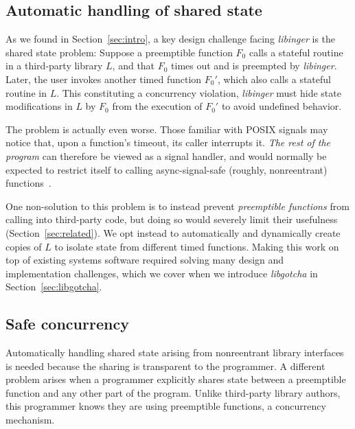 

\subsection{Automatic handling of shared state}
\label{sec:libinger:reentrancy}

As we found in Section~\ref{sec:intro}, a key design challenge facing
\textit{libinger} is the shared state problem:  Suppose a preemptible function
$F_0$ calls a stateful routine in a third-party library $L$, and
that $F_0$ times out and is preempted by \textit{libinger}.  Later, the
user invokes another timed function $F_0'$, which also calls a stateful
routine in $L$.  This constituting a concurrency violation,
\textit{libinger} must hide state modifications in $L$ by $F_0$
from the execution of $F_0'$ to avoid undefined behavior.

The problem is actually even worse.  Those familiar with POSIX signals may notice
that, upon a function's timeout, its caller interrupts it.  \textit{The rest of the
program} can therefore be viewed as a signal handler, and would normally be expected
to restrict itself to calling async-signal-safe (roughly, nonreentrant)
functions~\cite{signal-safety-manpage}.

One non-solution to this problem is to instead prevent \textit{preemptible functions}
from
calling into third-party code, but doing so would
severely limit their usefulness (Section~\ref{sec:related}).  We opt instead
to automatically and dynamically create copies of $L$ to
isolate state from different timed functions.  Making this work on top of
existing systems software required solving many
design and implementation challenges, which we cover when we introduce
\textit{libgotcha} in Section~\ref{sec:libgotcha}.


\subsection{Safe concurrency}
\label{sec:libinger:concurrency}

Automatically handling shared state arising from nonreentrant library interfaces is
needed because the sharing is transparent to the programmer.  A
different problem arises when a programmer explicitly shares state between a
preemptible function and any other part of the program.  Unlike third-party library
authors, this programmer knows they are using preemptible functions, a
concurrency mechanism.

